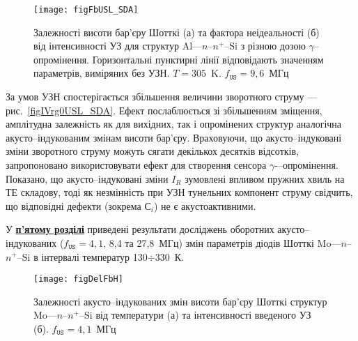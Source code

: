 \begin{SCfigure}
\texttt{[image: figFbUSL\_SDA]}
\caption{\label{figFbUSL_SDA}
Залежності висоти бар'єру Шотткі (а) та фактора неідеальності (б)  від інтенсивності УЗ для
структур Al---$n$--$n^+$--Si з різною дозою $\gamma$--опромінення.
Горизонтальні пунктирні лінії відповідають значенням параметрів, виміряних без УЗН.
\mbox{$T=305$~K.}
$f_\mathtt{US}=9,6$~МГц
}%
\end{SCfigure}

За умов УЗН спостерігається збільшення величини зворотного струму --- рис.~\ref{figIVrg0USL_SDA}.
Ефект послаблюється зі збільшенням зміщення, амплітудна залежність як для вихідних, так і
опромінених структур аналогічна акусто--індукованим змінам висоти бар'єру.
Враховуючи, що акусто--індуковані зміни зворотного струму можуть сягати декількох десятків відсотків,
запропоновано використовувати ефект для створення сенсора $\gamma$-–опромінення.
Показано, що акусто--індуковані зміни $I_R$ зумовлені впливом пружних хвиль на ТЕ складову,
тоді як незмінність при УЗН тунельних компонент струму свідчить,
що відповідні дефекти (зокрема С$_i$) не є акустоактивними.


У  \underline{\textbf{п'ятому розділі}} приведені результати досліджень
оборотних акусто--індукованих ($f_\mathtt{US}=4,1$, 8,4 та 27,8~МГц) змін
параметрів діодів Шотткі Mo---$n$--$n^+$--Si в інтервалі температур 130$\div$330~К.


\begin{SCfigure}[1.0][b]
\texttt{[image: figDelFbH]}
\caption{\label{figDelFbH}
Залежності акусто--індукованих змін висоти бар'єру Шотткі структур Mo---$n$--$n^+$--Si від температури (а)
та інтенсивності введеного УЗ (б).
$f_\mathtt{US}=4,1$~МГц
}%
\end{SCfigure}

